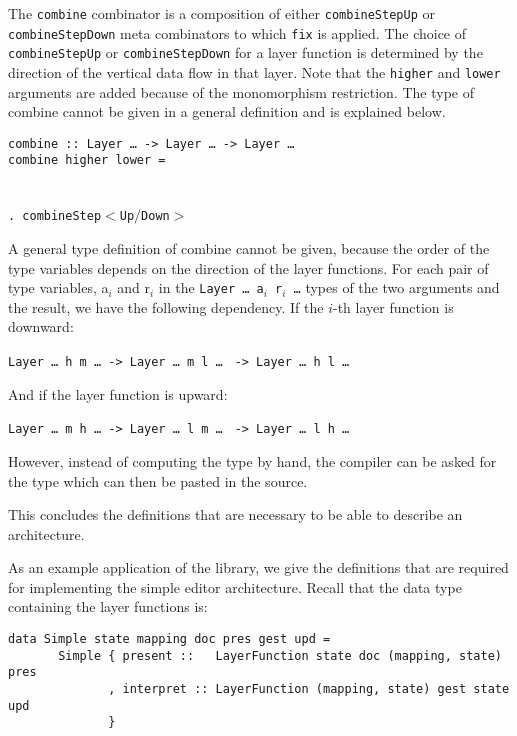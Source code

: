 The \texttt{combine} combinator is a composition of either \texttt{combineStepUp} or \texttt{combineStepDown} meta combinators to which \texttt{fix} is applied. The choice of \texttt{combineStepUp} or \texttt{combineStepDown} for a layer function is determined by the direction of the vertical data flow in that layer. Note that the \texttt{higher} and \texttt{lower} arguments are added because of the monomorphism restriction. The type of combine cannot be given in a general definition and is explained below.

\begin{tabbing}
{\tt combine}\verb| :: |{\tt Layer \dots}\verb| -> |{\tt Layer \dots}\verb| -> |{\tt Layer \dots }\\
{\tt co}\={\tt mbin}\={\tt e higher lower = }\\
\\
\>\>{\tt \dots}\\ 
\>\>\verb|. combine|{\tt Step$<$Up$/$Down$>$}\\
\>
\end{tabbing}

A general type definition of combine cannot be given, because the order of the type variables depends on the direction of the layer functions. For each pair of type variables, a$_i$ and r$_i$ in the \texttt{Layer \dots~a$_i$ r$_i$ \dots} types of the two arguments and the result, we have the following dependency. If the $i$-th layer function is downward:

{\tt Layer \dots~h m \dots}\verb| -> |{\tt Layer \dots~m l \dots} \verb| -> |{\tt Layer \dots~h l \dots}

And if the layer function is upward:

{\tt Layer \dots~m h \dots}\verb| -> |{\tt Layer \dots~l m \dots} \verb| -> |{\tt Layer \dots~l h \dots}

However, instead of computing the type by hand, the compiler can be asked for the type which can then be pasted in the source.

This concludes the definitions that are necessary to be able to describe an architecture. 


 As an example application of the library, we give the definitions that are required for implementing the simple editor architecture. Recall that the data type containing the layer functions is:

\begin{small}
\begin{verbatim}
data Simple state mapping doc pres gest upd =
       Simple { present ::   LayerFunction state doc (mapping, state) pres
              , interpret :: LayerFunction (mapping, state) gest state upd
              }
\end{verbatim}
\end{small}


